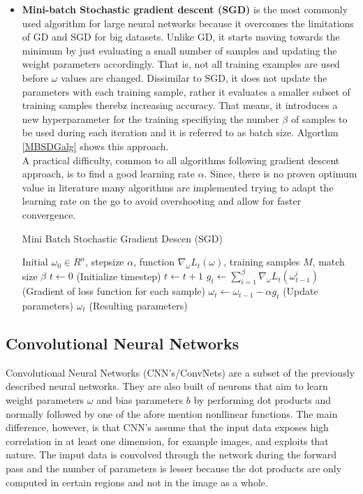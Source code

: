 \begin{itemize}
\item \textbf{Mini-batch Stochastic gradient descent (SGD)} is the most commonly used algorithm for large neural networks because it overcomes the limitations of GD and SGD for big datasets. Unlike GD, it starts moving towards the minimum by just evaluating a small number of samples and updating the weight parameters accordingly. That is, not all training examples are used before $\omega$ values are changed. Dissimilar to SGD, it does not update the parameters with each training sample, rather it evaluates a smaller subset of training samples therebz increasing accuracy. That means, it introduces a new hyperparameter for the training specifiying the number $\beta$ of samples to be used during each iteration and it is referred to as batch size. Algorthm \ref{MBSDGalg} shows this approach. \\
A practical difficulty, common to all algorithms following gradient descent approach, is to find a good learning rate $\alpha$. Since, there is no proven optimum value in literature many algorithms are implemented trying to adapt the learning rate on the go to avoid overshooting and allow for faster convergence.   

\begin{algorithm}
\caption{Mini Batch Stochastic Gradient Descen (SGD)}
\label{MBSDGalg}
\begin{algorithmic}[1]
    \Require Initial $ \omega_0 \in R^n $, stepsize $\alpha  $, function $\nabla_{\omega} L_t ( \omega )$, training samples $M$, match size $\beta$
    \State $t \leftarrow 0$ (Initialize timestep)
    \State $t \leftarrow t+1$
    \State $ g_t \leftarrow \sum_{i=1}^{\beta} \nabla_{\omega} L_t ( \omega_{t-1}^{i} )$ (Gradient of loss function for each sample) 
    \State $\omega_t \leftarrow \omega_{t-1} - \alpha g_t $ (Update parameters)
        \EndFor
    \EndWhile
    \State \Return $\omega_t $ (Resulting parameters)   
\end{algorithmic}
\end{algorithm}     

\end{itemize} 

\subsection{Convolutional Neural Networks}
Convolutional Neural Networks (CNN's/ConvNets) are a subset of the previously described neural networks. They are also built of neurons that aim to learn weight parameters $\omega$ and bias parameters $b$ by performing dot products and normally followed by one of the afore mention nonllinear functions. The main difference, however, is that CNN's assume that the input data exposes high correlation in at least one dimension, for example images, and exploits that nature. The imput data is convolved through the network during the forward pass and the number of parameters is lesser because the dot products are only computed in certain regions and not in the image as a whole.   

